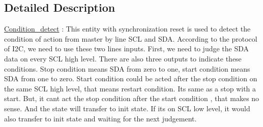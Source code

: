 \subsection{Detailed Description}
\hyperlink{class_condition__detect}{Condition\+\_\+detect} \+: This entity with synchronization reset is used to detect the condition of action from master by line S\+CL and S\+DA. According to the protocol of I2C, we need to use these two lines inputs. First, we need to judge the S\+DA data on every S\+CL high level. There are also three outputs to indicate these conditions. Stop condition means S\+DA from zero to one, start condition means S\+DA from one to zero. Start condition could be acted after the stop condition on the same S\+CL high level, that means restart condition. It\textquotesingle{}s same as a stop with a start. But, it can\textquotesingle{}t act the stop condition after the start condition , that makes no sense. And the state will transfer to init state. If it\textquotesingle{}s on S\+CL low level, it would also transfer to init state and waiting for the next judgement. 

